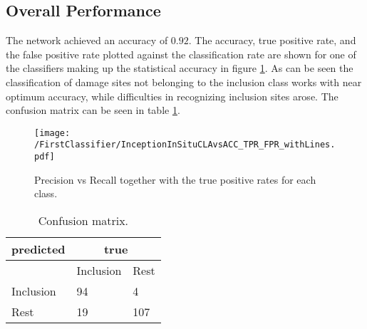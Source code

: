 
\subsection{Overall Performance}
The network achieved an accuracy of $0.92$. The accuracy, true positive rate, and the false positive rate plotted against the classification rate are shown for one of the classifiers making up the statistical accuracy in figure \ref{fig:FirstClassifierInSitu}. As can be seen the classification of damage sites not belonging to the inclusion class works with near optimum accuracy, while difficulties in recognizing inclusion sites arose. The confusion matrix can be seen in table \ref{tab:FirstClassifierConfusionMatrixInSitu}. \\

\begin{figure}[H]
\texttt{[image: /FirstClassifier/InceptionInSituCLAvsACC\_TPR\_FPR\_withLines.pdf]}
\caption{Precision vs Recall together with the true positive rates for each class. }
\label{fig:FirstClassifierInSitu}
\end{figure}

\begin{table}[H]
 \begin{center}
  \begin{tabular}{@{} *3l @{}} \toprule[2pt]
   predicted &  \multicolumn{2}{c}{true}  \\\midrule
    & Inclusion  & Rest   \\ 
   Inclusion  & 94 & 4 \\ 
   Rest  & 19 & 107 \\ \bottomrule[2pt]
  \end{tabular}
 \end{center}
 \caption{Confusion matrix.}
   \label{tab:FirstClassifierConfusionMatrixInSitu}
\end{table}

%


